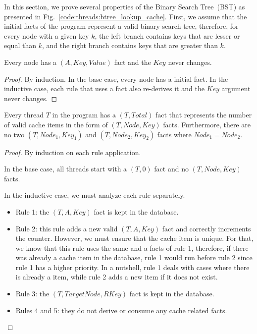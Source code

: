 In this section, we prove several properties of the Binary Search Tree~(BST) as
presented in Fig.~\ref{code:threads:btree_lookup_cache}. First, we assume that
the initial facts of the program represent a valid binary search tree,
therefore, for every node with a given key $k$, the left branch contains keys
that are lesser or equal than $k$, and the right branch contains keys that are
greater than $k$.

\begin{invariant}
Every node has a $(A, Key, Value)$ fact and the $Key$ never changes.
\end{invariant}
\begin{proof}
By induction. In the base case, every node has a  initial fact. In the
inductive case, each rule that uses a  fact also re-derives it and
the $Key$ argument never changes.
\end{proof}

\begin{invariant}\label{appendix:proof:key_value_invariant}
Every thread $T$ in the program has a $(T, Total)$ fact that
represents the number of valid cache items in the form of $(T, Node, Key)$
facts. Furthermore, there are no two $(T, Node_1, Key_1)$ and
$(T, Node_2, Key_2)$ facts where $Node_1 = Node_2$.
\end{invariant}
\begin{proof}
By induction on each rule application.

In the base case, all threads start with a $(T, 0)$ fact and no
$(T, Node, Key)$ facts.
 
In the inductive case, we must analyze each rule separately.

\begin{itemize}

  \item Rule 1: the $(T, A, Key)$ fact is kept in the database.

  \item Rule 2: this rule adds a new valid $(T, A, Key)$ fact and
     correctly increments the  counter. However, we must ensure
     that the cache item is unique. For that, we know that this rule uses the
     same  and a  facts of rule 1, therefore, if there
     was already a cache item in the database, rule 1 would run before rule 2
     since rule 1 has a higher priority. In a nutshell, rule 1 deals with cases
     where there is already a  item, while rule 2 adds a new item if
     it does not exist.

   \item Rule 3: the $(T, TargetNode, RKey)$ fact is kept in the
      database.

   \item Rules 4 and 5: they do not derive or consume any cache related facts.

\end{itemize}
\end{proof}

